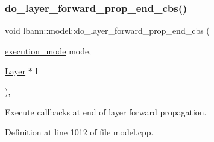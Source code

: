 \mbox{\label{classlbann_1_1model_a7d6b891f58a7df9726e4f2c48d1f957a}} 
\subsubsection{\texorpdfstring{do\+\_\+layer\+\_\+forward\+\_\+prop\+\_\+end\+\_\+cbs()}{do\_layer\_forward\_prop\_end\_cbs()}}
{\footnotesize\ttfamily void lbann\+::model\+::do\+\_\+layer\+\_\+forward\+\_\+prop\+\_\+end\+\_\+cbs (\begin{DoxyParamCaption}\item[{\hyperlink{base_8hpp_a2781a159088df64ed7d47cc91c4dc0a8}{execution\+\_\+mode}}]{mode,  }\item[{\hyperlink{classlbann_1_1Layer}{Layer} $\ast$}]{l }\end{DoxyParamCaption})\hspace{0.3cm}{\ttfamily [protected]}, {\ttfamily [virtual]}}

Execute callbacks at end of layer forward propagation. 

Definition at line 1012 of file model.\+cpp.


